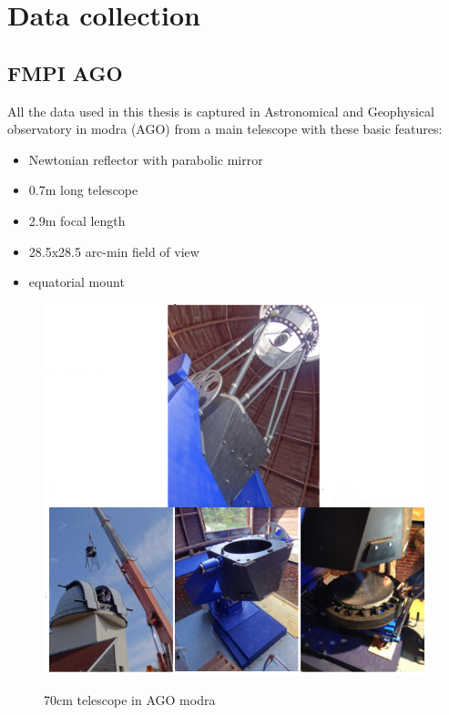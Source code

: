 \documentclass[12pt, a4paper, oneside]{book}
\begin{document}
\section{Data collection}

\subsection{FMPI AGO}
All the data used in this thesis is captured in Astronomical and Geophysical observatory in modra (AGO) from a main telescope with these basic features:
\begin{itemize}
    \item{Newtonian reflector with parabolic mirror}
    \item{0.7m long telescope}
    \item{2.9m focal length}
    \item{28.5x28.5 arc-min field of view}
    \item{equatorial mount}
\end{itemize}

\begin{figure}[!hbt]
    \begin{center}
        \includegraphics[scale=0.60]{images/telescope.png}
        \label{img:telescope}
        \caption{70cm telescope in AGO modra}
    \end{center}
\end{figure}
\end{document}
